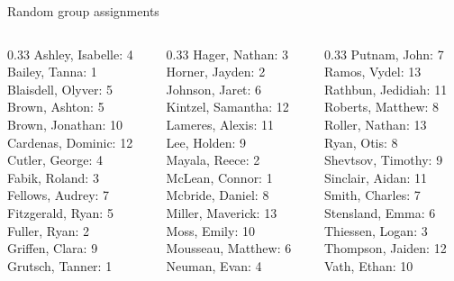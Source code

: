 \documentclass[10pt]{beamer}
\begin{document}
\begin{frame}{Random group assignments}
\footnotesize
\begin{columns}
\begin{column}{0.33\textwidth}
Ashley, Isabelle: 4 \\ 
Bailey, Tanna: 1 \\ 
Blaisdell, Olyver: 5 \\ 
Brown, Ashton: 5 \\ 
Brown, Jonathan: 10 \\ 
Cardenas, Dominic: 12 \\ 
Cutler, George: 4 \\ 
Fabik, Roland: 3 \\ 
Fellows, Audrey: 7 \\ 
Fitzgerald, Ryan: 5 \\ 
Fuller, Ryan: 2 \\ 
Griffen, Clara: 9 \\ 
Grutsch, Tanner: 1 \\\end{column}
\begin{column}{0.33\textwidth}
Hager, Nathan: 3 \\ 
Horner, Jayden: 2 \\ 
Johnson, Jaret: 6 \\ 
Kintzel, Samantha: 12 \\ 
Lameres, Alexis: 11 \\ 
Lee, Holden: 9 \\ 
Mayala, Reece: 2 \\ 
McLean, Connor: 1 \\ 
Mcbride, Daniel: 8 \\ 
Miller, Maverick: 13 \\ 
Moss, Emily: 10 \\ 
Mousseau, Matthew: 6 \\ 
Neuman, Evan: 4 \\\end{column}
\begin{column}{0.33\textwidth}
Putnam, John: 7 \\ 
Ramos, Vydel: 13 \\ 
Rathbun, Jedidiah: 11 \\ 
Roberts, Matthew: 8 \\ 
Roller, Nathan: 13 \\ 
Ryan, Otis: 8 \\ 
Shevtsov, Timothy: 9 \\ 
Sinclair, Aidan: 11 \\ 
Smith, Charles: 7 \\ 
Stensland, Emma: 6 \\ 
Thiessen, Logan: 3 \\ 
Thompson, Jaiden: 12 \\ 
Vath, Ethan: 10 \\\end{column}
\end{columns}
\end{frame}
\end{document}
